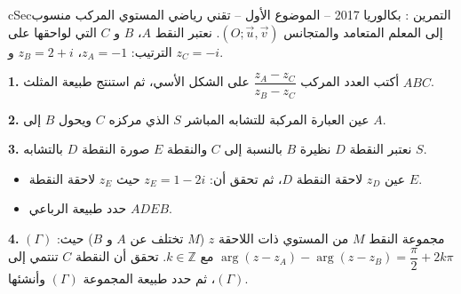 \documentclass[12pt,a4paper]{article}
\newenvironment{BOX}[2]{\begin{otherlanguage}{english}\begin{arbox}{#1}{#2}}{\end{arbox}\end{otherlanguage}}
\newcounter{exo}
\newenvironment{tamrin}[1]{\stepcounter{exo}\begin{BOX}{cSec}{التمرين \theexo: #1}}{\end{BOX}}
\newenvironment{sq}{\begin{itemize}[leftmargin=2.4em,itemsep=3pt]}{\end{itemize}}
\newcommand{\qa}{\item[(أ)]}\newcommand{\qb}{\item[(ب)]}\newcommand{\qc}{\item[(جـ)]}\newcommand{\qd}{\item[(د)]}\newcommand{\qe}{\item[(هـ)]}
\newcommand{\QQ}[1]{\par\smallskip\textbf{#1.} }
\begin{document}
\begin{tamrin}{بكالوريا 2017 -- الموضوع الأول -- تقني رياضي}
المستوي المركب منسوب إلى المعلم المتعامد والمتجانس $(O;\vec u,\vec v)$. نعتبر النقط $A$، $B$ و $C$ التي لواحقها على الترتيب: $z_A=-1$، $z_B=2+i$ و $z_C=-i$.

\QQ{1} أكتب العدد المركب $\dfrac{z_A-z_C}{z_B-z_C}$ على الشكل الأسي، ثم استنتج طبيعة المثلث $ABC$.

\QQ{2} عين العبارة المركبة للتشابه المباشر $S$ الذي مركزه $C$ ويحول $B$ إلى $A$.

\QQ{3} نعتبر النقطة $D$ نظيرة $B$ بالنسبة إلى $C$ والنقطة $E$ صورة النقطة $D$ بالتشابه $S$.
\begin{sq}
\qa عين $z_D$ لاحقة النقطة $D$، ثم تحقق أن: $z_E=1-2i$ حيث $z_E$ لاحقة النقطة $E$.
\qb حدد طبيعة الرباعي $ADEB$.
\end{sq}
\QQ{4} $(\Gamma)$ مجموعة النقط $M$ من المستوي ذات اللاحقة $z$ ($M$ تختلف عن $A$ و $B$) حيث:
$\arg(z-z_A)-\arg(z-z_B)=\dfrac{\pi}{2}+2k\pi$ مع $k\in\mathbb{Z}$.
تحقق أن النقطة $C$ تنتمي إلى $(\Gamma)$، ثم حدد طبيعة المجموعة $(\Gamma)$ وأنشئها.
\end{tamrin}
\end{document}

